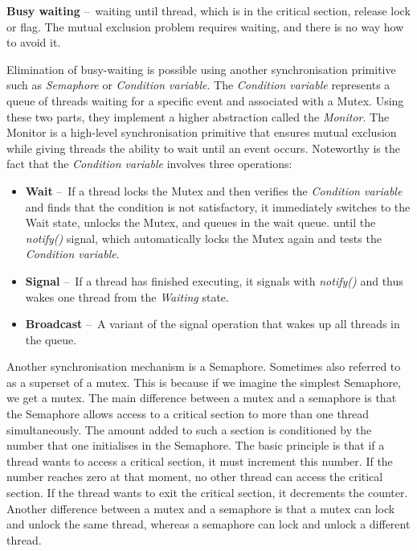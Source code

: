\begin{definition}
    \textbf{Busy waiting} \---\ waiting until thread, which is in the critical section, release lock or flag.
    The mutual exclusion problem requires waiting, and there is no way how to avoid it.
\end{definition}
Elimination of busy-waiting is possible using another synchronisation primitive such as \emph{Semaphore} or \emph{Condition variable}.
The \emph{Condition variable} represents a queue of threads waiting for a specific event and associated with a Mutex.
Using these two parts, they implement a higher abstraction called the \emph{Monitor}.
The Monitor is a high-level synchronisation primitive that ensures mutual exclusion while giving threads the ability to wait until an event occurs.
Noteworthy is the fact that the \emph{Condition variable} involves three operations:
\begin{itemize}[itemsep=1mm, parsep=0pt]
    \item \textbf {Wait} \---\ If a thread locks the Mutex and then verifies the \emph{Condition variable} and finds that the condition is not satisfactory, it immediately switches to the Wait state, unlocks the Mutex, and queues in the wait queue.
    until the \emph{notify()} signal, which automatically locks the Mutex again and tests the \emph{Condition variable}.
    \item \textbf{Signal} \---\ If a thread has finished executing, it signals with \emph{notify()} and thus wakes one thread from the \emph{Waiting} state.
    \item \textbf{Broadcast} \---\ A variant of the signal operation that wakes up all threads in the queue.
\end{itemize}
Another synchronisation mechanism is a Semaphore.
Sometimes also referred to as a superset of a mutex.
This is because if we imagine the simplest Semaphore, we get a mutex.
The main difference between a mutex and a semaphore is that the Semaphore allows access to a critical section to more than one thread simultaneously.
The amount added to such a section is conditioned by the number that one initialises in the Semaphore.
The basic principle is that if a thread wants to access a critical section, it must increment this number.
If the number reaches zero at that moment, no other thread can access the critical section.
If the thread wants to exit the critical section, it decrements the counter.
Another difference between a mutex and a semaphore is that a mutex can lock and unlock the same thread, whereas a semaphore can lock and unlock a different thread.


